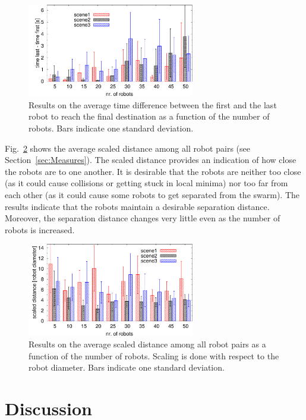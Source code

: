 \documentclass[letterpaper, 10pt, conference]{ieeeconf}
\begin{document}
\begin{figure}
\centering
\includegraphics[width=0.65\textwidth]{figs/figResFL}
\caption{Results on the average time difference between the first and
  the last robot to reach the
  final destination as a function of the number of robots. Bars
  indicate one standard deviation.}
\label{fig:ResFL}
\end{figure}

Fig.~\ref{fig:ResD} shows the average scaled distance among all robot
pairs (see Section~\ref{sec:Measures}). The scaled distance provides
an indication of how close the robots are to one another. It is
desirable that the robots are neither too close (as it could cause
collisions or getting stuck in local minima) nor too far from each
other (as it could cause some robots to get separated from the
swarm). The results indicate that the robots maintain a desirable
separation distance. Moreover, the separation distance changes very
little even as the number of robots is increased.

\begin{figure}
\centering
\includegraphics[width=0.65\textwidth]{figs/figResD}
\caption{Results on the average scaled distance among all robot pairs
  as a function of the number of robots. Scaling is done with respect
  to the robot diameter. Bars
  indicate one standard deviation.}
\label{fig:ResD}
\end{figure}


\section{Discussion}
\end{document}
